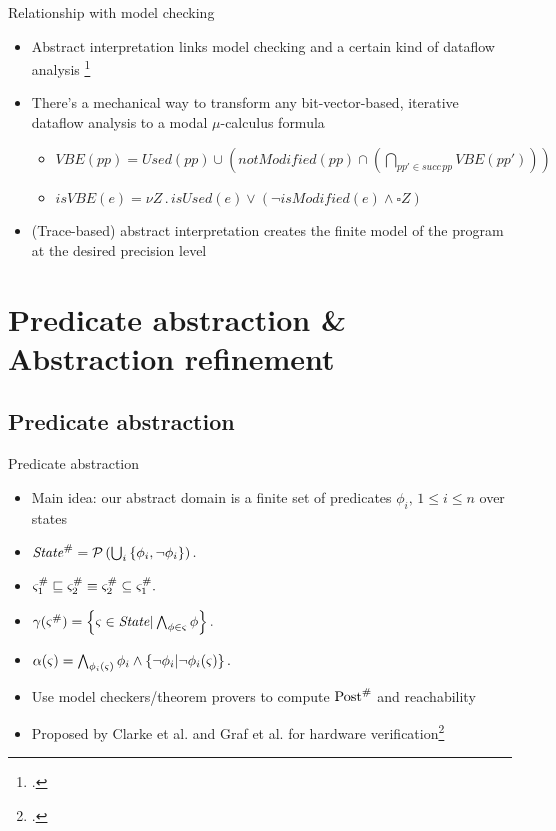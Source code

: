 \documentclass[aspectratio=169]{beamer}
\begin{document}
\begin{frame}{Relationship with model checking}
  \begin{itemize}
  \item Abstract interpretation links model
    checking and a certain kind of dataflow analysis
    \footcite{schmidt1998program,schmidt1998data}
  \item There's a mechanical way to transform any bit-vector-based,
    iterative dataflow analysis to a modal $\mu$-calculus formula
    \begin{itemize}
    \item
      $VBE(pp) = Used(pp) \cup (notModified(pp) \cap (\bigcap_{pp' \in
        succ\, pp} VBE(pp')))$
      \vspace{.5em}
    \item
      $isVBE(e) = \nu Z \,.\, isUsed(e) \vee (\neg isModified(e)
      \wedge \square Z)$
    \end{itemize}
  \item (Trace-based) abstract interpretation creates the finite model of the
    program at the desired precision level
  \end{itemize}
\end{frame}

\section{Predicate abstraction \& Abstraction refinement}
\subsection{Predicate abstraction}
\begin{frame}{Predicate abstraction}
  \begin{itemize}[<+->]
  \item Main idea: our abstract domain is a finite set of predicates $\phi_i,\, 1 \le i\le n$ over states
  \item $\mathit{State}^{\#} = \operatorname{\mathcal{P}}\left(\bigcup_{i}\left\{\phi_i, \neg \phi_i\right\}\right).$
  \item $\varsigma_1^{\#} \sqsubseteq \varsigma_2^{\#} \equiv \varsigma_2^{\#} \subseteq \varsigma_1^{\#}.$
  \item $\gamma(\varsigma^{\#}) = \left\{\varsigma \in \mathit{State} \vert \bigwedge_{\phi \in \varsigma} \phi\right\}.$
  \item $\alpha(\varsigma) = \bigwedge_{\phi_i(\varsigma)} \phi_i \wedge \left\{\neg\phi_i \vert \neg\phi_i(\varsigma)\right\}.$
  \item Use model checkers/theorem provers to compute $\mathrm{Post}^{\#}$ and reachability
  \item Proposed by Clarke et al. and Graf et al. for hardware verification\footcite{clarke1994model,graf1997construction}
  \end{itemize}
\end{frame}
\end{document}
